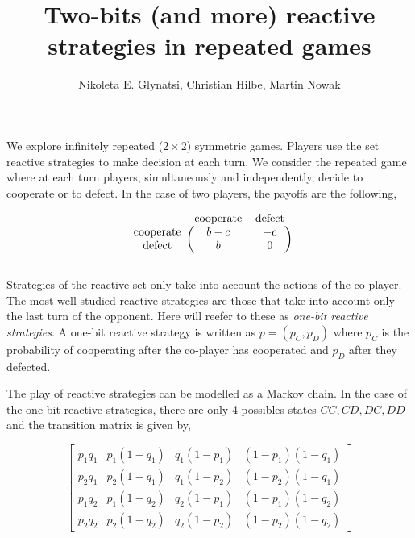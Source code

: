 \documentclass{article}
\title{Two-bits (and more) reactive strategies in repeated games}
\author{Nikoleta E. Glynatsi, Christian Hilbe, Martin Nowak}
\date{}
\begin{document}
\maketitle

We explore infinitely repeated (\(2 \times 2\)) symmetric games. Players use the
set reactive strategies to make decision at each turn. We consider the repeated
game where at each turn players, simultaneously and independently, decide to
cooperate or to defect. In the case of two players, the payoffs are the
following,

\begin{equation}\label{eq:payoffs}
    \begin{blockarray}{ccc}
        & \text{cooperate} & \text{defect} \\
        \begin{block}{c(cc)}
            \text{cooperate} & b - c & -c \\
            \text{defect} & b & 0 \\
        \end{block}
    \end{blockarray}
  \end{equation}


Strategies of the reactive set only take into account the actions of the
co-player. The most well studied reactive strategies are those that take into
account only the last turn of the opponent. Here will reefer to these as
\textit{one-bit reactive strategies}. A one-bit reactive strategy is written as
\(p = (p_{C}, p_{D})\) where \(p_{C}\) is the probability of cooperating after
the co-player has cooperated and \(p_{D}\) after they defected.

The play of reactive strategies can be modelled as a Markov chain. In the case
of the one-bit reactive strategies, there are only 4 possibles states \(CC, CD,
DC, DD\) and the transition matrix is given by,

\begin{equation}
\displaystyle \left[\begin{matrix}p_{1} q_{1} & p_{1} \left(1 - q_{1}\right) & q_{1} \left(1 - p_{1}\right) & \left(1 - p_{1}\right) \left(1 - q_{1}\right)\\p_{2} q_{1} & p_{2} \left(1 - q_{1}\right) & q_{1} \left(1 - p_{2}\right) & \left(1 - p_{2}\right) \left(1 - q_{1}\right)\\p_{1} q_{2} & p_{1} \left(1 - q_{2}\right) & q_{2} \left(1 - p_{1}\right) & \left(1 - p_{1}\right) \left(1 - q_{2}\right)\\p_{2} q_{2} & p_{2} \left(1 - q_{2}\right) & q_{2} \left(1 - p_{2}\right) & \left(1 - p_{2}\right) \left(1 - q_{2}\right)\end{matrix}\right]
\end{equation}
\end{document}
